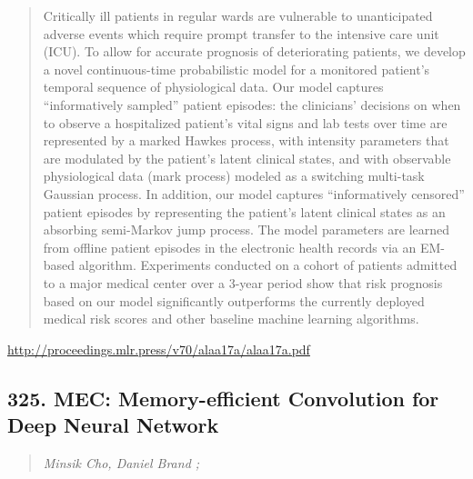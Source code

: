 \documentclass{article}
\begin{document}
\begin{quote}
    Critically ill patients in regular wards are vulnerable to unanticipated adverse events which require prompt transfer to the intensive care unit (ICU). To allow for accurate prognosis of deteriorating patients, we develop a novel continuous-time probabilistic model for a monitored patient’s temporal sequence of physiological data. Our model captures “informatively sampled” patient episodes: the clinicians’ decisions on when to observe a hospitalized patient’s vital signs and lab tests over time are represented by a marked Hawkes process, with intensity parameters that are modulated by the patient’s latent clinical states, and with observable physiological data (mark process) modeled as a switching multi-task Gaussian process. In addition, our model captures “informatively censored” patient episodes by representing the patient’s latent clinical states as an absorbing semi-Markov jump process. The model parameters are learned from offline patient episodes in the electronic health records via an EM-based algorithm. Experiments conducted on a cohort of patients admitted to a major medical center over a 3-year period show that risk prognosis based on our model significantly outperforms the currently deployed medical risk scores and other baseline machine learning algorithms.  \end{quote}

\href{http://proceedings.mlr.press/v70/alaa17a/alaa17a.pdf}{http://proceedings.mlr.press/v70/alaa17a/alaa17a.pdf}

\subsection{325. MEC: Memory-efficient Convolution for Deep Neural Network}

\begin{quote}
\footnotesize{\textit{Minsik Cho, Daniel Brand ;}}
\end{quote}
\end{document}
